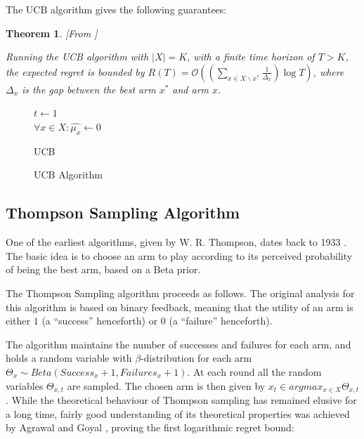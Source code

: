 \documentclass[MSc,beforeExam]{iitcsthesis}
\newtheorem{theorem}{Theorem}
\begin{document}
\noindent
	The UCB algorithm gives the following guarantees:
	
	
\begin{theorem}\label{thm:UCB}[From \cite{auer2002finite}]

		Running the UCB algorithm with $|X|=K$, with a finite time horizon of $ T > K$, the expected regret is bounded by $R(T) = \mathcal{O} \left( \left(\sum_{x\in X \backslash x^*} \frac{1}{\Delta_x} \right)\log T \right)$, where $\Delta_x$ is the gap between the best arm $x^*$ and arm $x$.

\end{theorem}

	\begin{figure}[h]
	\IncMargin{1em}
		\begin{algorithm}[H]
		
			$ t\leftarrow 1$\\
			$\forall x \in X : \hat{\mu_x} \leftarrow 0$\\
			\BlankLine
			
			\caption{UCB}
		\end{algorithm}
		\caption{UCB Algorithm}\label{algo_UCB}
	\end{figure}
\newpage
	\subsection{Thompson Sampling Algorithm}
	One of the earliest algorithms, given by W. R. Thompson, dates back to 1933 \cite{thompson1933likelihood}. The basic idea is to choose an arm to play according to its perceived probability of being the best arm,
based on a Beta prior.

	The Thompson Sampling algorithm proceeds as follows.
The original analysis for this algorithm is based on binary feedback, meaning that the utility of an
arm is either $1$ (a ``success'' henceforth) or $0$ (a ``failure'' henceforth).
	

The algorithm maintains the number of successes and failures for each arm, and holds a random variable with $\beta$-distribution for each arm $\Theta_x\sim Beta(Success_x+1,Failures_x+1)$.
	At each round all the random variables $\Theta_{x,t}$ are sampled.
	The chosen arm is then given by $x_t \in argmax_{x\in X} \Theta_{x,t}$.
	While the theoretical behaviour of Thompson sampling has remained elusive for a long time, fairly good understanding of its theoretical properties was achieved by Agrawal and Goyal \cite{agrawal2011analysis, agrawal2012further}, proving the first logarithmic regret bound: 
	
\end{document}
